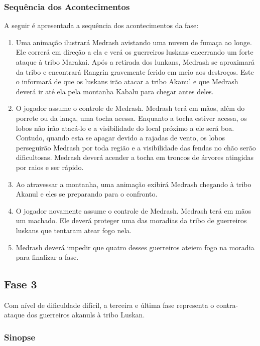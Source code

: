 \subsubsection{Sequência dos Acontecimentos}

A seguir é apresentada a sequência dos acontecimentos da fase:

\begin{enumerate}
\item Uma animação ilustrará Medrash avistando uma nuvem de fumaça ao longe. Ele correrá em direção a ela e verá os guerreiros luskans encerrando um forte ataque à tribo Marakai. Após a retirada dos lunkans, Medrash se aproximará da tribo e encontrará Rangrin gravemente ferido em meio aos destroços. Este o informará de que os luskans irão atacar a tribo Akanul e que Medrash deverá ir até ela pela montanha Kabalu para chegar antes deles.
\item O jogador assume o controle de Medrash. Medrash terá em mãos, além do porrete ou da lança, uma tocha acessa. Enquanto a tocha estiver acessa, os lobos não irão atacá-lo e a visibilidade do local próximo a ele será boa. Contudo, quando esta se apagar devido a rajadas de vento, os lobos perseguirão Medrash por toda região e a visibilidade das fendas no chão serão dificultosas. Medrash deverá acender a tocha em troncos de árvores atingidas por raios e ser rápido.
\item Ao atravessar a montanha, uma animação exibirá Medrash chegando à tribo Akanul e eles se preparando para o confronto.
\item O jogador novamente assume o controle de Medrash. Medrash terá em mãos um machado. Ele deverá proteger uma das moradias da tribo de guerreiros luskans que tentaram atear fogo nela.
\item Medrash deverá impedir que quatro desses guerreiros ateiem fogo na moradia para finalizar a fase.
\end{enumerate}

\subsection{Fase 3}

Com nível de dificuldade difícil, a terceira e última fase representa o contra-ataque dos guerreiros akanuls à tribo Luskan.

\subsubsection{Sinopse}

